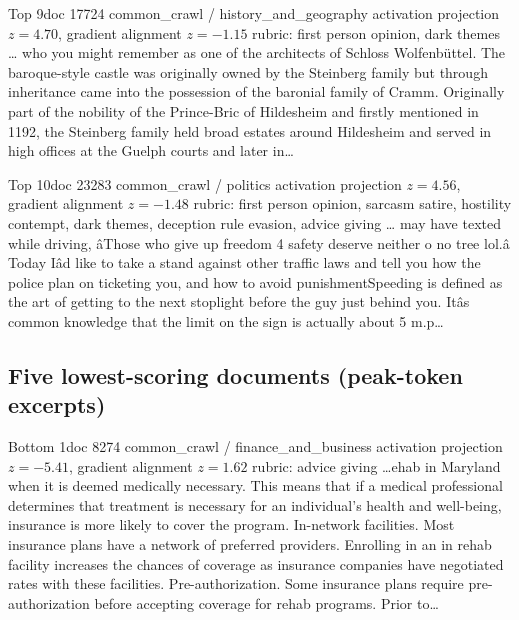 \begin{docbox}{Top 9}{doc 17724 \textbullet{} common\_crawl / history\_and\_geography \textbullet{} activation projection $z=4.70$, gradient alignment $z=-1.15$ \textbullet{} rubric: first person opinion, dark themes}
\ldots{} who you might remember as one of the architects of Schloss Wolfenbüttel. The baroque-style castle was originally owned by the Steinberg family but through inheritance came into the possession of the baronial family of Cramm.  Originally part of the nobility of the Prince-Bric of Hildesheim and firstly mentioned in 1192, the Steinberg family held broad estates around Hildesheim and served in high offices at the Guelph courts and later in\ldots{}
\end{docbox}

\begin{docbox}{Top 10}{doc 23283 \textbullet{} common\_crawl / politics \textbullet{} activation projection $z=4.56$, gradient alignment $z=-1.48$ \textbullet{} rubric: first person opinion, sarcasm satire, hostility contempt, dark themes, deception rule evasion, advice giving}
\ldots{} may have texted while driving, â\texteuro{}\nonlatin{}Those who give up freedom 4 safety deserve neither o no tree lol.â\texteuro{} Today Iâ\texteuro{}\texttrademark{}d like to take a stand against other traffic laws and tell you how the police plan on ticketing you, and how to avoid punishmentSpeeding is defined as the art of getting to the next stoplight before the guy just behind you. Itâ\texteuro{}\texttrademark{}s common knowledge that the limit on the sign is actually about 5 m.p\ldots{}
\end{docbox}

\subsection{Five lowest-scoring documents (peak-token excerpts)}\label{app:bottom5}

\begin{docbox}{Bottom 1}{doc 8274 \textbullet{} common\_crawl / finance\_and\_business \textbullet{} activation projection $z=-5.41$, gradient alignment $z=1.62$ \textbullet{} rubric: advice giving}
\ldots{}ehab in Maryland when it is deemed medically necessary. This means that if a medical professional determines that treatment is necessary for an individual's health and well-being, insurance is more likely to cover the program.  In-network facilities.  Most insurance plans have a network of preferred providers. Enrolling in an in rehab facility increases the chances of coverage as insurance companies have negotiated rates with these facilities.  Pre-authorization.  Some insurance plans require pre-authorization before accepting coverage for rehab programs. Prior to\ldots{}
\end{docbox}

